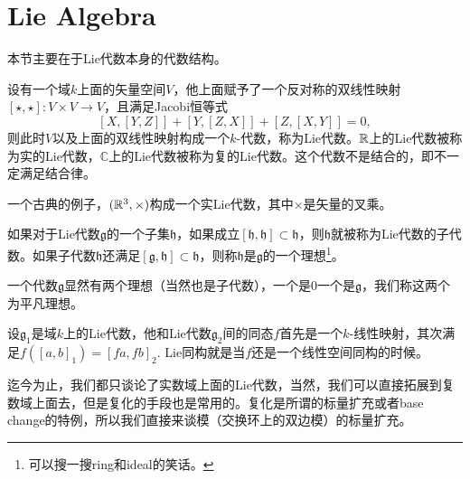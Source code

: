 \documentclass[11pt]{article}
\theoremstyle{definition}
\theoremstyle{plain}
\newcommand{\cc}{\mathbb{C}}
\newcommand{\lag}{{\mathfrak{g}}}
\begin{document}
\newpage

\section{Lie Algebra}

本节主要在于Lie代数本身的代数结构。

\para 设有一个域$k$上面的矢量空间$V$，他上面赋予了一个反对称的双线性映射$[\star,\star]:V\times V\to V$，且满足Jacobi恒等式
\[
[X,[Y,Z]]+[Y,[Z,X]]+[Z,[X,Y]]=0,
\]
则此时$V$以及上面的双线性映射构成一个$k$-代数，称为Lie代数。$\mathbb{R}$上的Lie代数被称为实的Lie代数，$\cc$上的Lie代数被称为复的Lie代数。这个代数不是结合的，即不一定满足结合律。

一个古典的例子，$(\mathbb{R}^3,\times)$构成一个实Lie代数，其中$\times$是矢量的叉乘。

\para 如果对于Lie代数$\lag$的一个子集$\mathfrak{h}$，如果成立$[\mathfrak{h},\mathfrak{h}]\subset \mathfrak{h}$，则$\mathfrak{h}$就被称为Lie代数的子代数。如果子代数$\mathfrak{h}$还满足$[\lag,\mathfrak{h}]\subset \mathfrak{h}$，则称$\mathfrak{h}$是$\lag$的一个{\kaishu 理想}\footnote{可以搜一搜ring和ideal的笑话。}。

一个代数$\lag$显然有两个理想（当然也是子代数），一个是$0$一个是$\lag$，我们称这两个为平凡理想。



\para 设$\lag_1$是域$k$上的Lie代数，他和Lie代数$\lag_2$间的同态$f$首先是一个$k$-线性映射，其次满足$f([a,b]_1)=[fa,fb]_2$. Lie同构就是当$f$还是一个线性空间同构的时候。

迄今为止，我们都只谈论了实数域上面的Lie代数，当然，我们可以直接拓展到复数域上面去，但是复化的手段也是常用的。复化是所谓的标量扩充或者base change的特例，所以我们直接来谈模（交换环上的双边模）的标量扩充。
\end{document}
